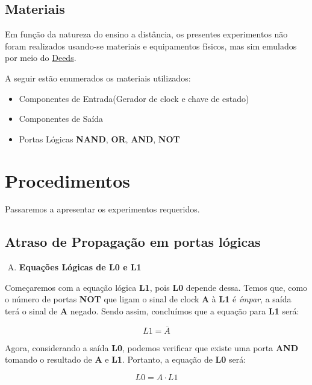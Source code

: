 \documentclass[12pt]{article}
\begin{document}
\subsection{Materiais}
\label{sec:Materiais}
Em função da natureza do ensino a distância, os presentes experimentos não foram
realizados usando-se materiais e equipamentos físicos, mas sim emulados por meio
do \href{https://www.digitalelectronicsdeeds.com/deeds.html}{Deeds}.

A seguir estão enumerados os materiais utilizados:
\begin{itemize}
    \item Componentes de Entrada(Gerador de clock e chave de estado)
    \item Componentes de Saída
    \item Portas Lógicas \textbf{NAND}, \textbf{OR}, \textbf{AND}, \textbf{NOT}
\end{itemize}

\section{Procedimentos}
\label{sec:Procedimentos}

Passaremos a apresentar os experimentos requeridos.

\subsection{Atraso de Propagação em portas lógicas}\label{sec:atraso_de_propagação}

\begin{enumerate}[A)]
\item \textbf{Equações Lógicas de L0 e L1}
\end{enumerate}

Começaremos com a equação lógica \textbf{L1}, pois \textbf{L0} depende dessa. Temos que, como
o número de portas \textbf{NOT} que ligam o sinal de clock \textbf{A} à
\textbf{L1} é \emph{ímpar}, a saída terá o sinal de \textbf{A} negado. Sendo
assim, concluímos que a equação para \textbf{L1} será:

\begin{equation}
L1 = \overline{A}
\end{equation}

Agora, considerando a saída \textbf{L0}, podemos verificar que existe uma porta
\textbf{AND} tomando o resultado de \textbf{A} e \textbf{L1}. Portanto, a equação de \textbf{L0} será:

\begin{equation}
L0 = A \cdot L1\label{eq:L0}
\end{equation}
\end{document}
